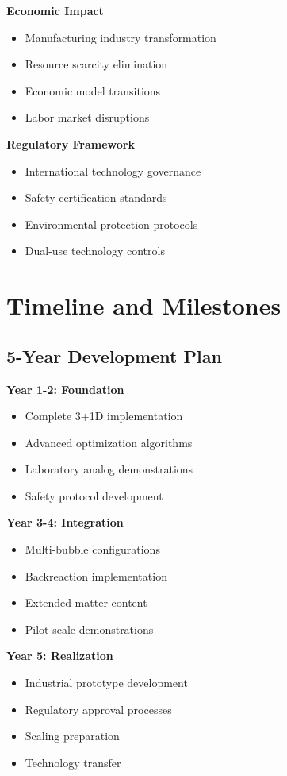 \documentclass[11pt]{article}
\begin{document}
\textbf{Economic Impact}
\begin{itemize}
\item Manufacturing industry transformation
\item Resource scarcity elimination
\item Economic model transitions
\item Labor market disruptions
\end{itemize}

\textbf{Regulatory Framework}
\begin{itemize}
\item International technology governance
\item Safety certification standards
\item Environmental protection protocols
\item Dual-use technology controls
\end{itemize}

\section{Timeline and Milestones}

\subsection{5-Year Development Plan}

\textbf{Year 1-2: Foundation}
\begin{itemize}
\item Complete 3+1D implementation
\item Advanced optimization algorithms
\item Laboratory analog demonstrations
\item Safety protocol development
\end{itemize}

\textbf{Year 3-4: Integration}
\begin{itemize}
\item Multi-bubble configurations
\item Backreaction implementation
\item Extended matter content
\item Pilot-scale demonstrations
\end{itemize}

\textbf{Year 5: Realization}
\begin{itemize}
\item Industrial prototype development
\item Regulatory approval processes
\item Scaling preparation
\item Technology transfer
\end{itemize}
\end{document}
